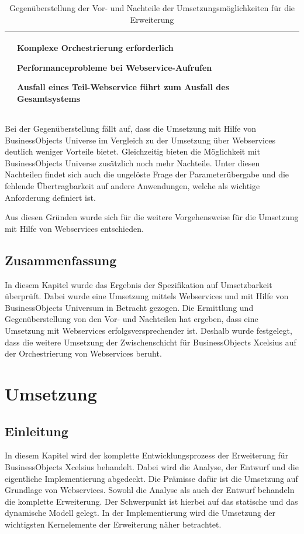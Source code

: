 \begin{onehalfspacing}
{\begin{table}[htbp]
\begin{tabular}{| l | >{\centering\arraybackslash} m{5cm} | >{\centering\arraybackslash} m{5cm} |}
& 


\begin{seList}
\item Komplexe Orchestrierung erforderlich
\item Performanceprobleme bei Webservice-Aufrufen
\item Ausfall eines Teil-Webservice führt zum Ausfall des Gesamtsystems
\end{seList}

\\	\hline
\end{tabular} 
\caption{Gegenüberstellung der Vor- und Nachteile der Umsetzungsmöglichkeiten für die Erweiterung \label{table:vergleich_umsetzung}}
\end{table}
}

Bei der Gegenüberstellung fällt auf, dass die Umsetzung mit Hilfe von BusinessObjects Universe im Vergleich zu der Umsetzung über Webservices deutlich weniger Vorteile bietet. Gleichzeitig bieten die Möglichkeit mit BusinessObjects Universe zusätzlich noch mehr Nachteile. Unter diesen Nachteilen findet sich auch die ungelöste Frage der Parameterübergabe und die fehlende Übertragbarkeit auf andere Anwendungen, welche als wichtige Anforderung definiert ist.

Aus diesen Gründen wurde sich für die weitere Vorgehensweise für die Umsetzung mit Hilfe von Webservices entschieden.

\section{Zusammenfassung}
In diesem Kapitel wurde das Ergebnis der Spezifikation auf Umsetzbarkeit überprüft. Dabei wurde eine Umsetzung mittels Webservices  und mit Hilfe von BusinessObjects Universum in Betracht gezogen. Die Ermittlung und Gegenüberstellung von den Vor- und Nachteilen hat ergeben, dass eine Umsetzung mit Webservices erfolgsversprechender ist. Deshalb wurde festgelegt, dass die weitere Umsetzung der Zwischenschicht für BusinessObjects Xcelsius auf der Orchestrierung von Webservices beruht.

\chapter{Umsetzung}

\section{Einleitung}
In diesem Kapitel wird der komplette Entwicklungsprozess der Erweiterung für BusinessObjects Xcelsius behandelt. Dabei wird die Analyse, der Entwurf und die eigentliche Implementierung abgedeckt. Die Prämisse dafür ist die Umsetzung auf Grundlage von Webservices. Sowohl die Analyse als auch der Entwurf behandeln die komplette Erweiterung. Der Schwerpunkt ist hierbei auf das statische und das dynamische Modell gelegt. In der Implementierung wird die Umsetzung der wichtigsten Kernelemente der Erweiterung näher betrachtet.


\end{onehalfspacing}
